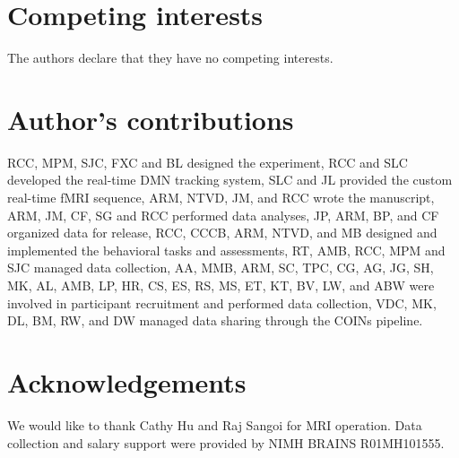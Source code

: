 \section*{Competing interests}
  The authors declare that they have no competing interests.

\section*{Author's contributions}
RCC, MPM, SJC, FXC and BL designed the experiment, RCC and SLC developed the real-time DMN tracking system, SLC and JL provided the custom real-time fMRI sequence, ARM, NTVD, JM, and RCC wrote the manuscript, ARM, JM, CF, SG and RCC performed data analyses, JP, ARM, BP, and CF organized data for release, RCC, CCCB, ARM, NTVD, and MB designed and implemented the behavioral tasks and assessments, RT, AMB, RCC, MPM and SJC managed data collection, AA, MMB, ARM, SC, TPC, CG, AG, JG, SH, MK, AL, AMB, LP, HR, CS, ES, RS, MS, ET, KT, BV, LW, and ABW were involved in participant recruitment and performed data collection, VDC, MK, DL, BM, RW, and DW managed data sharing through the COINs pipeline.

\section*{Acknowledgements}
We would like to thank Cathy Hu and Raj Sangoi for MRI operation. Data collection and salary support were provided by NIMH BRAINS R01MH101555.
